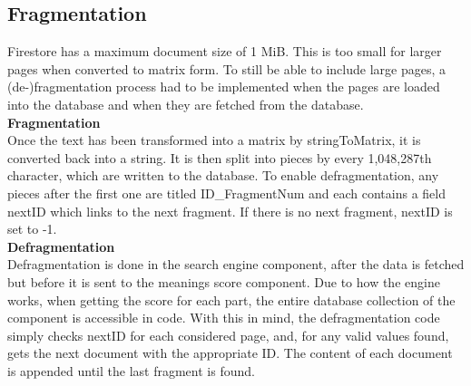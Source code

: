 \subsection{Fragmentation}
Firestore has a maximum document size of 1 MiB. This is too small for larger pages when converted to matrix form. To still be able to include large pages, a (de-)fragmentation process had to be implemented when the pages are loaded into the database and when they are fetched from the database. \\

\textbf{Fragmentation} \\
Once the text has been transformed into a matrix by stringToMatrix, it is converted back into a string. 
It is then split into pieces by every 1,048,287th character, which are written to the database. 
To enable defragmentation, any pieces after the first one are titled ID\_FragmentNum and each contains a field nextID which links to the next fragment.
If there is no next fragment, nextID is set to -1. \\

\textbf{Defragmentation}\\
Defragmentation is done in the search engine component, after the data is fetched but before it is sent to the meanings score component.
Due to how the engine works, when getting the score for each part, the entire database collection of the component is accessible in code.
With this in mind, the defragmentation code simply checks nextID for each considered page, and, for any valid values found, gets the next document with the appropriate ID.
The content of each document is appended until the last fragment is found.
